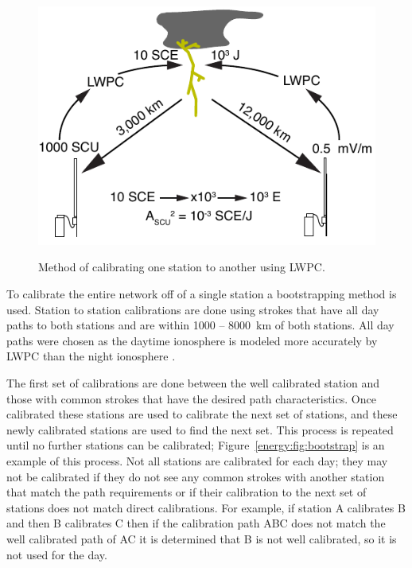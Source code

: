 \begin{figure}[ht!]
\centering
\includegraphics[scale=1]{energy/Figures/PPS_Method.pdf}\\
\caption{Method of calibrating one station to another using LWPC.}
\label{energy:fig:calibrate}
\end{figure}

To calibrate the entire network off of a single station a bootstrapping method is used.
Station to station calibrations are done using strokes that have all day paths to both stations and are within 1000 -- 8000~km of both stations.
All day paths were chosen as the daytime ionosphere is modeled more accurately by LWPC than the night ionosphere \citep{McRae2000d}.

The first set of calibrations are done between the well calibrated station and those with common strokes that have the desired path characteristics.
Once calibrated these stations are used to calibrate the next set of stations, and these newly calibrated stations are used to find the next set.
This process is repeated until no further stations can be calibrated; Figure~\ref{energy:fig:bootstrap} is an example of this process.
Not all stations are calibrated for each day; they may not be calibrated if they do not see any common strokes with another station that match the path requirements or if their calibration to the next set of stations does not match direct calibrations.
For example, if station A calibrates B and then B calibrates C then if the calibration path ABC does not match the well calibrated path of AC it is determined that B is not well calibrated, so it is not used for the day.

